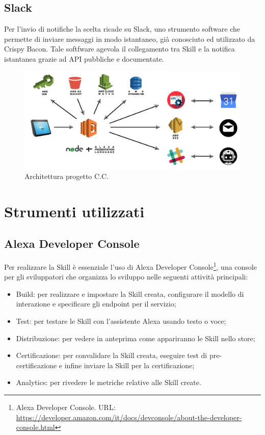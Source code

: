 \subsection{Slack}
Per l'invio di notifiche la scelta ricade su Slack, uno strumento software che permette di inviare messaggi in modo istantaneo, già conosciuto ed utilizzato da Crispy Bacon. Tale softfware agevola il collegamento tra Skill e la notifica istantanea grazie ad API pubbliche e documentate.  

\begin{figure}[H] 
    \centering 
    \includegraphics[width=1\columnwidth]{immagini/architettura.png}
    \caption{\label{fig:architettura}Architettura progetto C.C.}
\end{figure}

\section{Strumenti utilizzati}
\subsection{Alexa Developer Console}
Per realizzare la Skill è essenziale l'uso di Alexa Developer Console\footnote{Alexa Developer Console. URL: \href{https://developer.amazon.com/it/docs/devconsole/about-the-developer-console.html}{https://developer.amazon.com/it/docs/devconsole/about-the-developer-console.html}}, una console per gli sviluppatori che organizza lo sviluppo nelle seguenti attività principali:
\begin{itemize}
    \item Build: per realizzare e impostare la Skill creata, configurare il modello di interazione e specificare gli endpoint per il servizio;
    \item Test: per testare le Skill con l'assistente Alexa usando testo o voce;
    \item Distribuzione: per vedere in anteprima come appariranno le Skill nello store;
    \item Certificazione: per convalidare la Skill creata, eseguire test di pre-certificazione e infine inviare la Skill per la certificazione;
    \item Analytics: per rivedere le metriche relative alle Skill create.
\end{itemize}

